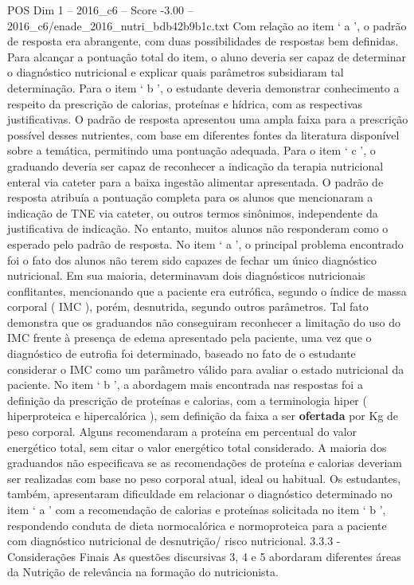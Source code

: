 \begin{textsample}{POS Dim 1 – 2016\_c6 – Score -3.00 – 2016\_c6/enade\_2016\_nutri\_bdb42b9b1c.txt}
Com relação ao item ‘ a ’, o padrão de resposta era abrangente, com duas possibilidades de respostas bem definidas.
Para alcançar a pontuação total do item, o aluno deveria ser capaz de determinar o diagnóstico nutricional e explicar quais parâmetros subsidiaram tal determinação.
Para o item ‘ b ’, o estudante deveria demonstrar conhecimento a respeito da prescrição de calorias, proteínas e hídrica, com as respectivas justificativas.
O padrão de resposta apresentou uma ampla faixa para a prescrição possível desses nutrientes, com base em diferentes fontes da literatura disponível sobre a temática, permitindo uma pontuação adequada.
Para o item ‘ c ’, o graduando deveria ser capaz de reconhecer a indicação da terapia nutricional enteral via cateter para a baixa ingestão alimentar apresentada.
O padrão de resposta atribuía a pontuação completa para os alunos que mencionaram a indicação de TNE via cateter, ou outros termos sinônimos, independente da justificativa de indicação.
No entanto, muitos alunos não responderam como o esperado pelo padrão de resposta.
No item ‘ a ’, o principal problema encontrado foi o fato dos alunos não terem sido capazes de fechar um único diagnóstico nutricional.
Em sua maioria, determinavam dois diagnósticos nutricionais conflitantes, mencionando que a paciente era eutrófica, segundo o índice de massa corporal ( IMC ), porém, desnutrida, segundo outros parâmetros.
Tal fato demonstra que os graduandos não conseguiram reconhecer a limitação do uso do IMC frente à presença de edema apresentado pela paciente, uma vez que o diagnóstico de eutrofia foi determinado, baseado no fato de o estudante considerar o IMC como um parâmetro válido para avaliar o estado nutricional da paciente.
No item ‘ b ’, a abordagem mais encontrada nas respostas foi a definição da prescrição de proteínas e calorias, com a terminologia hiper ( hiperproteica e hipercalórica ), sem definição da faixa a ser \textbf{ofertada} por Kg de peso corporal.
Alguns recomendaram a proteína em percentual do valor energético total, sem citar o valor energético total considerado.
A maioria dos graduandos não especificava se as recomendações de proteína e calorias deveriam ser realizadas com base no peso corporal atual, ideal ou habitual.
Os estudantes, também, apresentaram dificuldade em relacionar o diagnóstico determinado no item ‘ a ’ com a recomendação de calorias e proteínas solicitada no item ‘ b ’, respondendo conduta de dieta normocalórica e normoproteica para a paciente com diagnóstico nutricional de desnutrição/ risco nutricional. 3.3.3 - Considerações Finais As questões discursivas 3, 4 e 5 abordaram diferentes áreas da Nutrição de relevância na formação do nutricionista.

\end{textsample}
